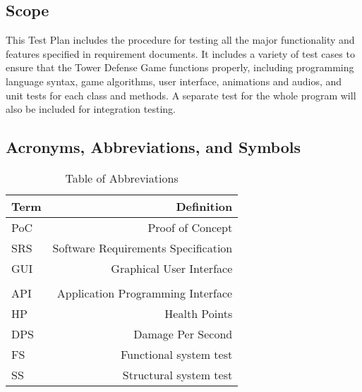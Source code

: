 \documentclass[12pt]{article}
\begin{document}
	\subsection{Scope}
	This Test Plan includes the procedure for testing all the major functionality and features specified in requirement documents. It includes a variety of test cases to ensure that the Tower Defense Game functions properly, including programming language syntax, game algorithms, user interface, animations and audios, and unit tests for each class and methods. A separate test for the whole program will also be included for integration testing.
	


    \newpage
	\subsection{Acronyms, Abbreviations, and Symbols}
	
	
	\begin{table}[!htbp]
	\centering

	\begin{tabular}[pos]{|l|r|}
		
		\hline
		\textbf{Term}& \textbf{Definition} \\ \hline
		PoC & Proof of Concept \\ \hline
		SRS & Software Requirements Specification \\ \hline
		GUI & Graphical User Interface \\ \hline
		\color{red}{Slick2D} & \color{red}{Slick2D Library} \\ \hline
		API & Application Programming Interface \\ \hline
		HP & Health Points \\ \hline
		DPS & Damage Per Second \\ \hline
		FS & Functional system test\\\hline
		SS & Structural system test\\
		\hline
	\end{tabular}
		\caption{Table of Abbreviations}
	\label{Table}
	\end{table}
\end{document}

